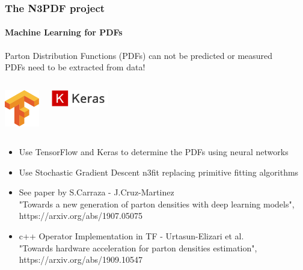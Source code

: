 \documentclass[aspectratio=43]{beamer}
\begin{document}
\begin{frame}
	
	\frametitle{The N3PDF project}
	\framesubtitle{Machine Learning for PDFs}

	\footnotesize Parton Distribution Functions (PDFs) can not be predicted or measured\\
	{\color{red} PDFs need to be extracted from data!}

	\vspace{0.5cm}
	
	\begin{columns}
		
		
		\includegraphics[width = 1.5cm]{plots/section2/TF.png}
				
				
		\includegraphics[width = 2.5cm]{plots/section2/Keras.png}
		
	\end{columns}
	
	\vspace{0.5cm}
	
	\begin{itemize}
		\item \footnotesize Use TensorFlow and Keras to determine the PDFs using neural networks
		\item \footnotesize Use Stochastic Gradient Descent {\color{violet} n3fit} replacing primitive fitting algorithms
	    \item \footnotesize See paper by S.Carraza - J.Cruz-Martinez \\
		\footnotesize {\color{blue}"Towards a new generation of parton densities with deep learning models",\\ https://arxiv.org/abs/1907.05075}
		\item c++ Operator Implementation in TF - Urtasun-Elizari et al.\\
		{\color{blue}"Towards hardware acceleration for parton densities estimation",\\ https://arxiv.org/abs/1909.10547}
	\end{itemize}

\end{frame}
\end{document}
